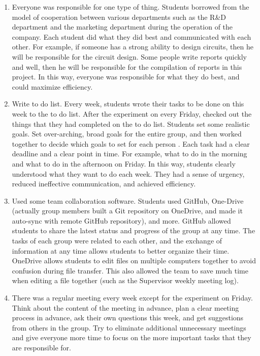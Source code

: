 \documentclass[12pt, a4paper]{report}
\begin{document}
\begin{enumerate}

\item Everyone was responsible for one type of thing. Students borrowed from the model of cooperation between various departments such as the R\&D department and the marketing department during the operation of the company.  Each student did what they did best and communicated with each other. For example, if someone has a strong ability to design circuits, then he will be responsible for the circuit design. Some people write reports quickly and well, then he will be responsible for the compilation of reports in this project. In this way, everyone was responsible for what they do best, and could maximize efficiency.
\item Write to do list. Every week, students wrote their tasks to be done on this week to the to do list. After the experiment on every Friday, checked out the things that they had completed on the to do list. Students set some realistic goals. Set over-arching, broad goals for the entire group, and then worked together to decide which goals to set for each person \cite{ref:e1}. Each task had a clear deadline and a clear point in time. For example, what to do in the morning and what to do in the afternoon on Friday. In this way, students clearly understood what they want to do each week. They had a sense of urgency, reduced ineffective communication, and achieved efficiency.
\item Used some team collaboration software. Students used GitHub, One-Drive (actually group members built a Git repository on OneDrive, and made it auto-sync with remote GitHub repository), and more. GitHub allowed students to share the latest status and progress of the group at any time. The tasks of each group were related to each other, and the exchange of information at any time allows students to better organize their time. OneDrive allows students to edit files on multiple computers together to avoid confusion during file transfer. This also allowed the team to save much time when editing a file together (such as the Supervisor weekly meeting log).
\item There was a regular meeting every week except for the experiment on Friday. Think about the content of the meeting in advance, plan a clear meeting process in advance, ask their own questions this week, and get suggestions from others in the group. Try to eliminate additional unnecessary meetings and give everyone more time to focus on the more important tasks that they are responsible for.

\end{enumerate}
\end{document}
